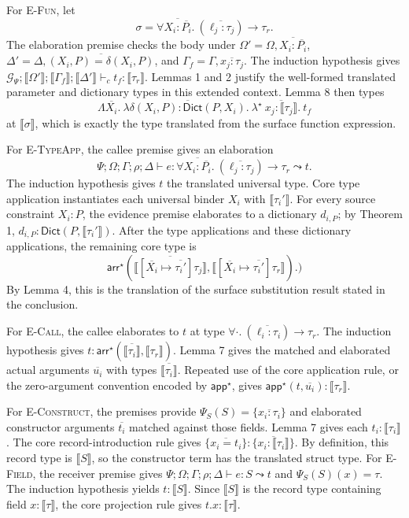 \documentclass[manuscript,nonacm]{acmart}
\newcommand{\subst}[3]{[#2\mapsto #1]#3}
\newcommand{\ftype}[3]{\forall #1.\ (#2) \to #3}
\newcommand{\emptyctx}{\cdot}
\newcommand{\ectx}{\Psi;\Omega;\Gamma;\rho;\Delta}
\newcommand{\has}{\vdash}
\newcommand{\elab}{\leadsto}
\newcommand{\trans}[1]{\llbracket #1 \rrbracket}
\newcommand{\lambdastar}{\lambda^{\star}}
\newcommand{\appstar}{\mathsf{app}^{\star}}
\newcommand{\arrstar}{\mathsf{arr}^{\star}}
\newcommand{\Dict}{\mathsf{Dict}}
\begin{document}
For \textsc{E-Fun}, let
\[
  \sigma=
  \ftype{\overline{X_i:\overline{P_i}}}
         {\overline{\ell_j:\tau_j}}
         {\tau_r}.
\]
The elaboration premise checks the body under
$\Omega'=\Omega,\overline{X_i:\overline{P_i}}$,
$\Delta'=\Delta,\overline{(X_i,P)=\delta(X_i,P)}$,
and $\Gamma_f=\Gamma,\overline{x_j:\tau_j}$.
The induction hypothesis gives
$\mathcal{G}_\Psi;\trans{\Omega'};\trans{\Gamma_f};\trans{\Delta'}
\has_c t_f:\trans{\tau_r}$.
Lemmas 1 and 2 justify the well-formed translated parameter and dictionary types in this extended context.
Lemma 8 then types
\[
  \Lambda \overline{X_i}.\
  \lambda \overline{\delta(X_i,P):\Dict(P,X_i)}.\
  \lambdastar\ \overline{x_j:\trans{\tau_j}}.\ t_f
\]
at $\trans{\sigma}$, which is exactly the type translated from the surface function expression.

For \textsc{E-TypeApp}, the callee premise gives an elaboration
\[
  \ectx\has e:
  \ftype{\overline{X_i:\overline{P_i}}}
         {\overline{\ell_j:\tau_j}}
         {\tau_r}
  \elab t.
\]
The induction hypothesis gives $t$ the translated universal type.
Core type application instantiates each universal binder $X_i$ with
$\trans{\tau_i'}$.
For every source constraint $X_i:P$, the evidence premise elaborates to a dictionary $d_{i,P}$; by Theorem 1,
$d_{i,P}:\Dict(P,\trans{\tau_i'})$.
After the type applications and these dictionary applications, the remaining core type is
\[
  \arrstar(
    \overline{\trans{\subst{\overline{\tau_i'}}{\overline{X_i}}\tau_j}},
    \trans{\subst{\overline{\tau_i'}}{\overline{X_i}}\tau_r}).
  )
\]
By Lemma 4, this is the translation of the surface substitution result stated in the conclusion.

For \textsc{E-Call}, the callee elaborates to $t$ at type
$\ftype{\emptyctx}{\overline{\ell_i:\tau_i}}{\tau_r}$.
The induction hypothesis gives
$t:\arrstar(\overline{\trans{\tau_i}},\trans{\tau_r})$.
Lemma 7 gives the matched and elaborated actual arguments
$\overline{u_i}$ with types $\overline{\trans{\tau_i}}$.
Repeated use of the core application rule, or the zero-argument convention encoded by $\appstar$, gives
$\appstar(t,\overline{u_i}):\trans{\tau_r}$.

For \textsc{E-Construct}, the premises provide
$\Psi_S(S)=\{\overline{x_i:\tau_i}\}$ and elaborated constructor arguments
$\overline{t_i}$ matched against those fields.
Lemma 7 gives each $t_i:\trans{\tau_i}$.
The core record-introduction rule gives
$\{\overline{x_i=t_i}\}:\{\overline{x_i:\trans{\tau_i}}\}$.
By definition, this record type is $\trans{S}$, so the constructor term has the translated struct type.
For \textsc{E-Field}, the receiver premise gives
$\ectx\has e:S\elab t$ and $\Psi_S(S)(x)=\tau$.
The induction hypothesis yields $t:\trans{S}$.
Since $\trans{S}$ is the record type containing field $x:\trans{\tau}$, the core projection rule gives
$t.x:\trans{\tau}$.
\end{document}
